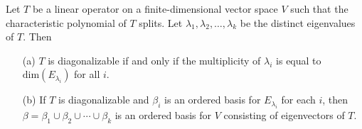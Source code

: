 \begin{theorem}
    Let \( T  \) be a linear operator on a finite-dimensional vector space \( V  \) such that the characteristic polynomial of \( T  \) splits. Let \( {\lambda}_{1}, {\lambda}_{2}, \dots, {\lambda}_{k} \) be the distinct eigenvalues of \( T  \). Then
    \begin{enumerate}
        \item[(a)] \( T  \) is diagonalizable if and only if the multiplicity of \( {\lambda}_{i} \) is equal to \( \text{dim}({E}_{{\lambda}_{i}}) \) for all \( i  \).
        \item[(b)] If \( T  \) is diagonalizable and \( {\beta}_{i} \) is an ordered basis for \( {E}_{{\lambda}_{i}} \) for each \( i  \), then \( \beta = {\beta}_{1} \cup {\beta}_{2} \cup \cdots \cup {\beta}_{k} \) is an ordered basis for \( V  \) consisting of eigenvectors of \( T  \).
    \end{enumerate}
\end{theorem}
